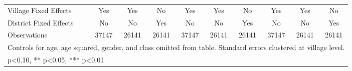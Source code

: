 \begin{sidewaystable}[htbp]
\begin{tabular}{l*{9}{c}}
Village Fixed Effects&      Yes   &      Yes   &       No   &      Yes   &      Yes   &       No   &      Yes   &      Yes   &       No   \\
District Fixed Effects&       No   &       No   &      Yes   &       No   &       No   &      Yes   &       No   &       No   &      Yes   \\
\midrule
Observations    &    37147   &    26141   &    26141   &    37147   &    26141   &    26141   &    37147   &    26141   &    26141   \\
\bottomrule
\multicolumn{10}{l}{\footnotesize Controls for age, age squared, gender, and class omitted from table. Standard errors clustered at village level.}\\
\multicolumn{10}{l}{\footnotesize * p<0.10, ** p<0.05, *** p<0.01}\\
\end{tabular}
\end{sidewaystable}
